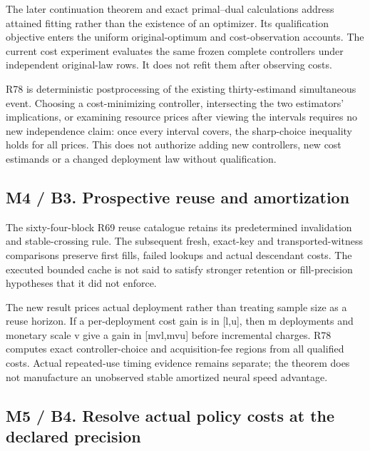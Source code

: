 The later continuation theorem and exact primal--dual calculations
address attained fitting rather than the existence of an optimizer. Its
qualification objective enters the uniform original-optimum and
cost-observation accounts. The current cost experiment evaluates the
same frozen complete controllers under independent original-law rows. It
does not refit them after observing costs.

R78 is deterministic postprocessing of the existing thirty-estimand
simultaneous event. Choosing a cost-minimizing controller, intersecting
the two estimators' implications, or examining resource prices after
viewing the intervals requires no new independence claim: once every
interval covers, the sharp-choice inequality holds for all prices. This
does not authorize adding new controllers, new cost estimands or a
changed deployment law without qualification.

\hypertarget{m4-b3.-prospective-reuse-and-amortization}{%
\subsection{M4 / B3. Prospective reuse and
amortization}\label{m4-b3.-prospective-reuse-and-amortization}}

The sixty-four-block R69 reuse catalogue retains its predetermined
invalidation and stable-crossing rule. The subsequent fresh, exact-key
and transported-witness comparisons preserve first fills, failed lookups
and actual descendant costs. The executed bounded cache is not said to
satisfy stronger retention or fill-precision hypotheses that it did not
enforce.

The new result prices actual deployment rather than treating sample size
as a reuse horizon. If a per-deployment cost gain is in {[}l,u{]}, then
m deployments and monetary scale v give a gain in {[}mvl,mvu{]} before
incremental charges. R78 computes exact controller-choice and
acquisition-fee regions from all qualified costs. Actual repeated-use
timing evidence remains separate; the theorem does not manufacture an
unobserved stable amortized neural speed advantage.

\hypertarget{m5-b4.-resolve-actual-policy-costs-at-the-declared-precision}{%
\subsection{M5 / B4. Resolve actual policy costs at the declared
precision}\label{m5-b4.-resolve-actual-policy-costs-at-the-declared-precision}}

